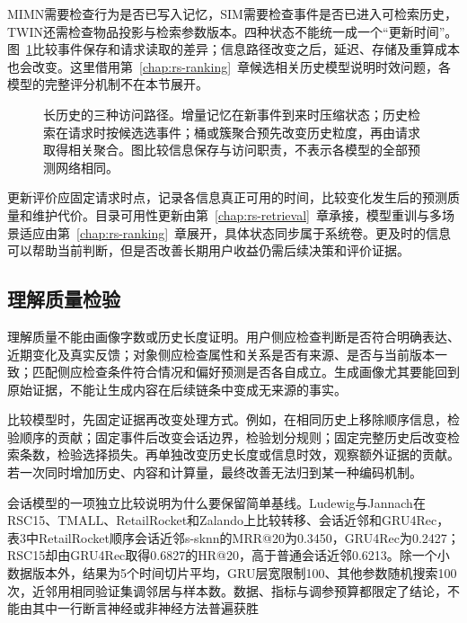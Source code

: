 MIMN需要检查行为是否已写入记忆，SIM需要检查事件是否已进入可检索历史，TWIN还需检查物品投影与检索参数版本。四种状态不能统一成一个“更新时间”。图~\ref{fig:rs-history-access}比较事件保存和请求读取的差异；信息路径改变之后，延迟、存储及重算成本也会改变。这里借用第~\ref{chap:rs-ranking}~章候选相关历史模型说明时效问题，各模型的完整评分机制不在本节展开。

\begin{figure}[htbp]
  \centering
  
  \caption{长历史的三种访问路径。增量记忆在新事件到来时压缩状态；历史检索在请求时按候选选事件；桶或簇聚合预先改变历史粒度，再由请求取得相关聚合。图比较信息保存与访问职责，不表示各模型的全部预测网络相同。}
  \label{fig:rs-history-access}
\end{figure}

更新评价应固定请求时点，记录各信息真正可用的时间，比较变化发生后的预测质量和维护代价。目录可用性更新由第~\ref{chap:rs-retrieval}~章承接，模型重训与多场景适应由第~\ref{chap:rs-ranking}~章展开，具体状态同步属于系统卷。更及时的信息可以帮助当前判断，但是否改善长期用户收益仍需后续决策和评价证据。

\subsection{理解质量检验}
\label{sec:rs-understanding-quality}

理解质量不能由画像字数或历史长度证明。用户侧应检查判断是否符合明确表达、近期变化及真实反馈；对象侧应检查属性和关系是否有来源、是否与当前版本一致；匹配侧应检查条件符合情况和偏好预测是否各自成立。生成画像尤其要能回到原始证据，不能让生成内容在后续链条中变成无来源的事实。

比较模型时，先固定证据再改变处理方式。例如，在相同历史上移除顺序信息，检验顺序的贡献；固定事件后改变会话边界，检验划分规则；固定完整历史后改变检索条数，检验选择损失。再单独改变历史长度或信息时效，观察额外证据的贡献。若一次同时增加历史、内容和计算量，最终改善无法归到某一种编码机制。

会话模型的一项独立比较说明为什么要保留简单基线。Ludewig与Jannach在RSC15、TMALL、RetailRocket和Zalando上比较转移、会话近邻和GRU4Rec，表3中RetailRocket顺序会话近邻s-sknn的MRR@20为0.3450，GRU4Rec为0.2427；RSC15却由GRU4Rec取得0.6827的HR@20，高于普通会话近邻0.6213。除一个小数据版本外，结果为5个时间切片平均，GRU层宽限制100、其他参数随机搜索100次，近邻用相同验证集调邻居与样本数。数据、指标与调参预算都限定了结论，不能由其中一行断言神经或非神经方法普遍获胜


